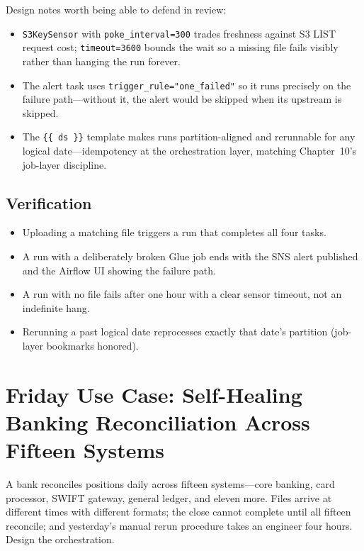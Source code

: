Design notes worth being able to defend in review:
\begin{itemize}
    \item \texttt{S3KeySensor} with \texttt{poke\_interval=300} trades freshness against S3 LIST request cost; \texttt{timeout=3600} bounds the wait so a missing file fails visibly rather than hanging the run forever.
    \item The alert task uses \texttt{trigger\_rule="one\_failed"} so it runs precisely on the failure path---without it, the alert would be skipped when its upstream is skipped.
    \item The \texttt{\{\{ ds \}\}} template makes runs partition-aligned and rerunnable for any logical date---idempotency at the orchestration layer, matching Chapter~10's job-layer discipline.
\end{itemize}

\subsection*{Verification}
\begin{itemize}
    \item Uploading a matching file triggers a run that completes all four tasks.
    \item A run with a deliberately broken Glue job ends with the SNS alert published and the Airflow UI showing the failure path.
    \item A run with no file fails after one hour with a clear sensor timeout, not an indefinite hang.
    \item Rerunning a past logical date reprocesses exactly that date's partition (job-layer bookmarks honored).
\end{itemize}

\section{Friday Use Case: Self-Healing Banking Reconciliation Across Fifteen Systems}
A bank reconciles positions daily across fifteen systems---core banking, card processor, SWIFT gateway, general ledger, and eleven more. Files arrive at different times with different formats; the close cannot complete until all fifteen reconcile; and yesterday's manual rerun procedure takes an engineer four hours. Design the orchestration.

